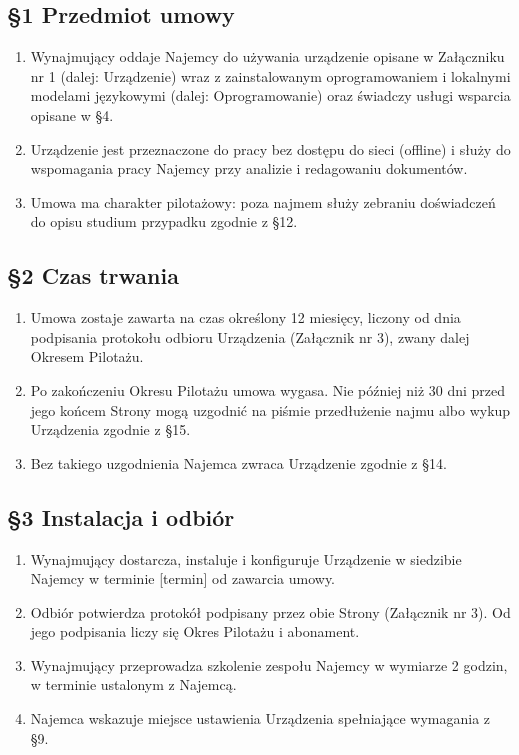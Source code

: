\documentclass[11pt,a4paper]{article}
\begin{document}
\subsection*{§1 Przedmiot umowy}
\begin{enumerate}
\item Wynajmujący oddaje Najemcy do używania urządzenie opisane w Załączniku nr 1 (dalej: Urządzenie) wraz z zainstalowanym oprogramowaniem i lokalnymi modelami językowymi (dalej: Oprogramowanie) oraz świadczy usługi wsparcia opisane w §4.
\item Urządzenie jest przeznaczone do pracy bez dostępu do sieci (offline) i służy do wspomagania pracy Najemcy przy analizie i redagowaniu dokumentów.
\item Umowa ma charakter pilotażowy: poza najmem służy zebraniu doświadczeń do opisu studium przypadku zgodnie z §12.
\end{enumerate}

\subsection*{§2 Czas trwania}
\begin{enumerate}
\item Umowa zostaje zawarta na czas określony 12 miesięcy, liczony od dnia podpisania protokołu odbioru Urządzenia (Załącznik nr 3), zwany dalej Okresem Pilotażu.
\item Po zakończeniu Okresu Pilotażu umowa wygasa. Nie później niż 30 dni przed jego końcem Strony mogą uzgodnić na piśmie przedłużenie najmu albo wykup Urządzenia zgodnie z §15.
\item Bez takiego uzgodnienia Najemca zwraca Urządzenie zgodnie z §14.
\end{enumerate}

\subsection*{§3 Instalacja i odbiór}
\begin{enumerate}
\item Wynajmujący dostarcza, instaluje i konfiguruje Urządzenie w siedzibie Najemcy w terminie [termin] od zawarcia umowy.
\item Odbiór potwierdza protokół podpisany przez obie Strony (Załącznik nr 3). Od jego podpisania liczy się Okres Pilotażu i abonament.
\item Wynajmujący przeprowadza szkolenie zespołu Najemcy w wymiarze 2 godzin, w terminie ustalonym z Najemcą.
\item Najemca wskazuje miejsce ustawienia Urządzenia spełniające wymagania z §9.
\end{enumerate}
\end{document}
